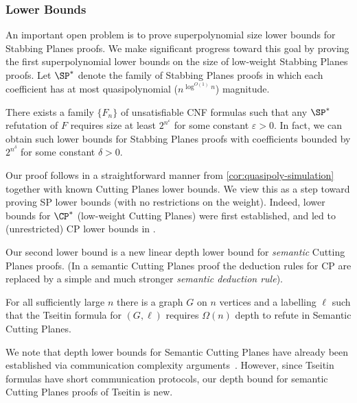 \subsubsection{Lower Bounds} 
An important open problem is to prove superpolynomial size lower bounds for Stabbing Planes proofs.
We make significant progress toward this goal by proving the first superpolynomial lower bounds
on the size of low-weight Stabbing Planes proofs.
Let $\SP^*$ denote the family of Stabbing Planes proofs in which each coefficient has at most quasipolynomial ($n^{\log^{O(1)} n}$) magnitude.
%

\begin{theorem}\label{thm:spstar-lb}
There exists a family %
%
$\{F_n\}$ of unsatisfiable CNF formulas  %
such that any $\SP^*$ refutation of $F$ requires size at least $2^{n^\varepsilon}$ for
some %
constant $\varepsilon > 0$. In fact, we can obtain such lower bounds for Stabbing Planes proofs with coefficients bounded by $2^{n^\delta}$ for some constant $\delta>0$.
\end{theorem}

Our proof follows in a straightforward manner from \autoref{cor:quasipoly-simulation} together with known Cutting Planes lower bounds.
We view this as a step toward proving SP lower bounds (with no restrictions on the weight).
Indeed, lower bounds for $\CP^*$ (low-weight Cutting Planes) \cite{BonetPR97} were first established, and led to (unrestricted) CP lower bounds
in %
\cite{Pudlak97}. 


Our second lower bound is a new linear depth lower bound for \emph{semantic}
Cutting Planes proofs.
(In a semantic Cutting Planes proof the deduction rules for CP are replaced by
a simple and much stronger \emph{semantic deduction rule}).
%
%

\begin{theorem}
\label{depth-lb}
   For all sufficiently large $n$ there is a graph $G$ on $n$ vertices and a labelling $\ell$ such that the Tseitin formula for $(G, \ell)$ requires $\Omega(n)$ depth to refute in Semantic Cutting Planes.
\end{theorem}


%
We note that depth lower bounds for Semantic Cutting Planes have already
been  %
established  %
%
via communication complexity arguments~\cite{ipu:cp}.  %
However, since Tseitin formulas have short communication protocols,
our depth bound for semantic Cutting Planes proofs of Tseitin is new.
%
%

